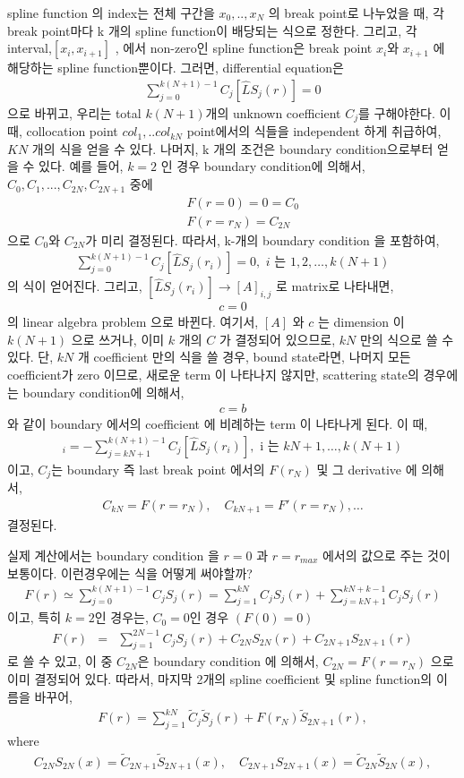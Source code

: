 \documentclass[10pt]{article}
\newcommand{\bea}{\begin{eqnarray}}
\newcommand{\eea}{\end{eqnarray}}
\newcommand{\no}{\nonumber \\}
\begin{document}
 spline function 의 index는
전체 구간을 $x_0,..,x_N$ 의 break point로 나누었을 때,
각 break point마다 k 개의 spline function이 배당되는
식으로 정한다. 그리고, 각 interval,$[x_i,x_{i+1}]$ , 
에서 non-zero인 spline function은 break point
$x_i$와 $x_{i+1}$ 에 해당하는 spline function뿐이다.  
그러면, differential equation은
\bea
\sum_{j=0}^{k(N+1)-1} C_j [\hat{L} S_j(r)]=0
\eea
으로 바뀌고, 우리는 total $k(N+1)$개의 unknown coefficient
$C_j$를 구해야한다. 이 때, collocation point $col_1,..col_{kN}$ 
point에서의 식들을 independent 하게 취급하여, $KN$ 개의
식을 얻을 수 있다. 나머지, k 개의 조건은 boundary 
condition으로부터 얻을 수 있다.
예를 들어, $k=2$ 인 경우 boundary condition에 의해서,
$C_0,C_1,...,C_{2N},C_{2N+1}$ 중에
\bea
& &F(r=0)=0=C_0\no
& &F(r=r_N)=C_{2N} 
\eea
으로 $C_0$와 $C_{2N}$가 미리 결정된다. 
따라서, k-개의 boundary condition 을 포함하여, 
\bea
\sum_{j=0}^{k(N+1)-1} C_j [\hat{L} S_j(r_i)]=0,\mbox{
 $i$ 는 $1,2,\dots,k(N+1)$}
\eea
의 식이 얻어진다. 그리고, $[\hat{L} S_j(r_i)]\to [A]_{i,j}$
로 matrix로 나타내면,
\bea
[A]c=0
\eea
의 linear algebra problem 으로 바뀐다. 여기서,
$[A]$ 와 $c$ 는 dimension 이 $k(N+1)$ 으로 쓰거나,
이미 $k$ 개의 $C$ 가 결정되어 있으므로, $kN$ 만의 
식으로 쓸 수 있다. 단, $kN$ 개 coefficient 만의
식을 쓸 경우, bound state라면, 나머지 모든 coefficient가 
zero 이므로, 새로운 term 이 나타나지 않지만,
scattering state의 경우에는 boundary condition에 의해서,
\bea
[A]c=b
\eea
와 같이 boundary 에서의 coefficient 에 비례하는 
term 이 나타나게 된다.
이 때, 
\bea
[b]_i=-\sum_{j=kN+1}^{k(N+1)-1} C_j[\hat{L} S_j(r_i)],
\mbox{ i 는 $kN+1,\dots,k(N+1)$}
\eea
이고, $C_j$는 boundary 즉 last break point 에서의 
$F(r_N)$ 및 그 derivative 에 의해서,
\bea
C_{kN}=F(r=r_N),\quad C_{kN+1}=F'(r=r_N),\dots
\eea
결정된다. 

실제 계산에서는 boundary condition 을 $r=0$ 과
$r=r_{max}$ 에서의 값으로 주는 것이 보통이다. 
이런경우에는 
식을 어떻게 써야할까? 
\bea
F(r)\simeq \sum_{j=0}^{k(N+1)-1}C_j S_j(r)
     =\sum_{j=1}^{kN} C_j S_j(r)
     +\sum_{j=kN+1}^{kN+k-1} C_j S_j(r)    
\eea
이고, 특히 $k=2$인 경우는, $C_0=0$인 경우 $(F(0)=0)$
\bea
F(r)&=&\sum_{j=1}^{2N-1} C_j S_j(r)
       +C_{2N}S_{2N}(r)+C_{2N+1}S_{2N+1}(r)   
\eea
로 쓸 수 있고, 이 중 $C_{2N}$은 boundary condition
에 의해서, $C_{2N}=F(r=r_N)$ 으로 이미 결정되어 있다.
따라서, 마지막 2개의 spline coefficient 및
spline function의 이름을 바꾸어, 
\bea
F(r)=\sum_{j=1}^{kN} \tilde{C}_j \tilde{S}_j(r)
       +F(r_N)\tilde{S}_{2N+1}(r) ,   
\eea
where
\bea 
C_{2N}S_{2N}(x)=\tilde{C}_{2N+1}\tilde{S}_{2N+1}(x),\quad
C_{2N+1}S_{2N+1}(x)=\tilde{C}_{2N}\tilde{S}_{2N}(x),
\eea 
\end{document}
